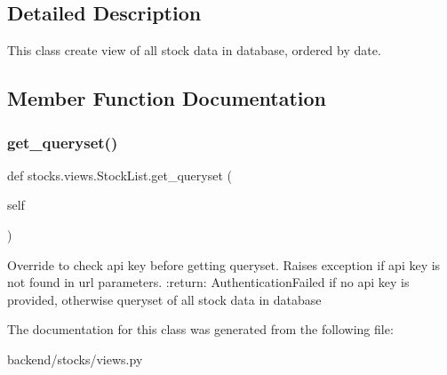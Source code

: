 \subsection{Detailed Description}
\begin{DoxyVerb}This class create view of all stock data in database, ordered by date.
\end{DoxyVerb}
 

\subsection{Member Function Documentation}
\mbox{\label{classstocks_1_1views_1_1_stock_list_a59e9ccb2be0430bbeef05167009e40c3}} 
\subsubsection{\texorpdfstring{get\+\_\+queryset()}{get\_queryset()}}
{\footnotesize\ttfamily def stocks.\+views.\+Stock\+List.\+get\+\_\+queryset (\begin{DoxyParamCaption}\item[{}]{self }\end{DoxyParamCaption})}

\begin{DoxyVerb}Override to check api key before getting queryset. Raises exception
if api key is not found in url parameters.
:return: AuthenticationFailed if no api key is provided,
 otherwise queryset of all stock data in database
\end{DoxyVerb}
 

The documentation for this class was generated from the following file\+:\begin{DoxyCompactItemize}
\item 
backend/stocks/views.\+py\end{DoxyCompactItemize}
